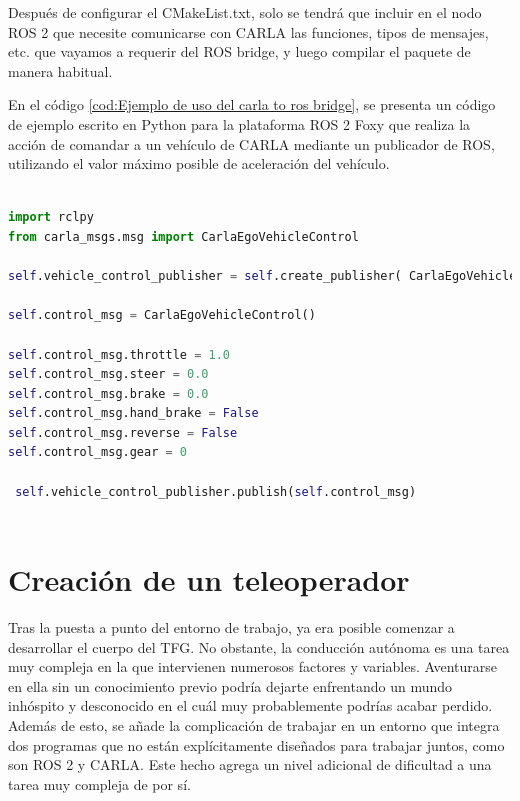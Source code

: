 Después de configurar el  CMakeList.txt, solo se tendrá que incluir en el nodo ROS 2 que necesite comunicarse con CARLA las funciones, tipos de mensajes, etc. que vayamos a requerir del ROS bridge, y luego compilar el paquete de manera habitual.

\bigskip

En el código \ref{cod:Ejemplo de uso del carla to ros bridge}, se presenta un código de ejemplo escrito en Python para la plataforma ROS 2 Foxy que realiza la acción de comandar a un vehículo de CARLA mediante un publicador de ROS, utilizando el valor máximo posible de aceleración del vehículo.

  \begin{code}[H]
	\begin{lstlisting}[language=Python]
	
import rclpy
from carla_msgs.msg import CarlaEgoVehicleControl

self.vehicle_control_publisher = self.create_publisher( CarlaEgoVehicleControl, "/carla/ego_vehicle/vehicle_control_cmd", 10)       
       
self.control_msg = CarlaEgoVehicleControl()

self.control_msg.throttle = 1.0
self.control_msg.steer = 0.0 
self.control_msg.brake = 0.0
self.control_msg.hand_brake = False
self.control_msg.reverse = False
self.control_msg.gear = 0

 self.vehicle_control_publisher.publish(self.control_msg)
 
	\end{lstlisting}
\caption[Ejemplo de uso del CARLA to ROS bridge ]{Ejemplo de uso del CARLA to ROS bridge}
\label{cod:Ejemplo de uso del carla to ros bridge}
\end{code}

\section{Creación de un teleoperador}

Tras la puesta a punto del entorno de trabajo, ya era posible comenzar a desarrollar el cuerpo del \ac{TFG}. No obstante, la conducción autónoma es una tarea muy compleja en la que intervienen numerosos factores y variables. Aventurarse en ella sin un conocimiento previo podría dejarte enfrentando un mundo inhóspito y desconocido en el cuál muy probablemente podrías acabar perdido. Además de esto, se añade la complicación de trabajar en un entorno que integra dos programas que no están explícitamente diseñados para trabajar juntos, como son ROS 2 y CARLA. Este hecho agrega un nivel adicional de dificultad a una tarea muy compleja de por sí.

